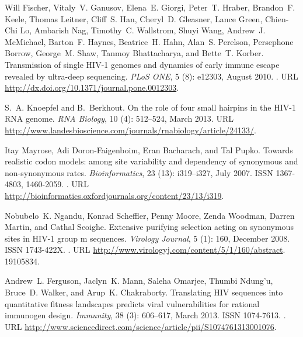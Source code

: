 \documentclass[11pt]{article}
\begin{document}
\begin{thebibliography}{48}
Will Fischer, Vitaly~V. Ganusov, Elena~E. Giorgi, Peter~T. Hraber, Brandon~F.
  Keele, Thomas Leitner, Cliff~S. Han, Cheryl~D. Gleasner, Lance Green,
  Chien-Chi Lo, Ambarish Nag, Timothy~C. Wallstrom, Shuyi Wang, Andrew~J.
  {McMichael}, Barton~F. Haynes, Beatrice~H. Hahn, Alan~S. Perelson, Persephone
  Borrow, George~M. Shaw, Tanmoy Bhattacharya, and Bette~T. Korber.
\newblock Transmission of single {HIV-1} genomes and dynamics of early immune
  escape revealed by ultra-deep sequencing.
\newblock \emph{{PLoS} {ONE}}, 5 (8): e12303, August 2010.
\newblock {}.
\newblock URL \url{http://dx.doi.org/10.1371/journal.pone.0012303}.

S.~A. Knoepfel and B.~Berkhout.
\newblock On the role of four small hairpins in the {HIV-1} {RNA} genome.
\newblock \emph{{RNA} Biology}, 10 (4): 512--524, March 2013.
\newblock URL
  \url{http://www.landesbioscience.com/journals/rnabiology/article/24133/}.

Itay Mayrose, Adi Doron-Faigenboim, Eran Bacharach, and Tal Pupko.
\newblock Towards realistic codon models: among site variability and dependency
  of synonymous and non-synonymous rates.
\newblock \emph{Bioinformatics}, 23 (13): i319--i327, July
  2007.
\newblock ISSN 1367-4803, 1460-2059.
\newblock {}.
\newblock URL
  \url{http://bioinformatics.oxfordjournals.org/content/23/13/i319}.

Nobubelo~K. Ngandu, Konrad Scheffler, Penny Moore, Zenda Woodman, Darren
  Martin, and Cathal Seoighe.
\newblock Extensive purifying selection acting on synonymous sites in {HIV-1}
  group m sequences.
\newblock \emph{Virology Journal}, 5 (1): 160, December 2008.
\newblock ISSN 1743-{422X}.
\newblock {}.
\newblock URL \url{http://www.virologyj.com/content/5/1/160/abstract}.
 19105834.

Andrew L. Ferguson, Jaclyn K. Mann, Saleha Omarjee, Thumbi Ndung'u, Bruce D.
  Walker, and Arup K. Chakraborty.
\newblock Translating {HIV} sequences into quantitative fitness landscapes
  predicts viral vulnerabilities for rational immunogen design.
\newblock \emph{Immunity}, 38 (3): 606--617, March 2013.
\newblock ISSN 1074-7613.
\newblock {}.
\newblock URL
  \url{http://www.sciencedirect.com/science/article/pii/S1074761313001076}.


\end{thebibliography}
\end{document}
